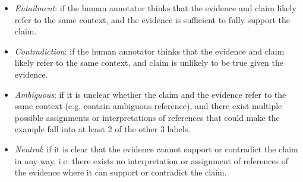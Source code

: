 \begin{itemize}[leftmargin=*, itemsep=0em]
    \item \emph{Entailment}: if the human annotator thinks that the evidence and claim likely refer to the same context, and the evidence is sufficient to fully support the claim.
    \item \emph{Contradiction}: if the human annotator thinks that the evidence and claim likely refer to the same context, and claim is unlikely to be true given the evidence.
    \item \emph{Ambiguous}: if it is unclear whether the claim and the evidence refer to the same context (e.g. contain ambiguous reference), and there exist multiple possible assignments or interpretations of references that could make the example fall into at least 2 of the other 3 labels.
    \item \emph{Neutral}: if it is clear that the evidence cannot support or contradict the claim in any way, i.e. there exists no interpretation or assignment of references of the evidence where it can support or contradict the claim.
\end{itemize}

